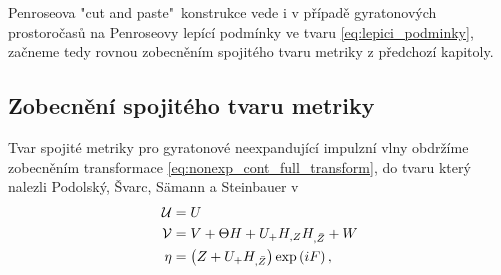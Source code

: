 Penroseova "cut and paste"\ konstrukce vede i v případě gyratonových prostoročasů na Penroseovy lepící podmínky ve tvaru \eqref{eq:lepici_podminky}, začneme tedy rovnou zobecněním
spojitého tvaru metriky z předchozí kapitoly.

\subsection{Zobecnění spojitého tvaru metriky}
Tvar spojité metriky pro gyratonové neexpandující impulzní vlny obdržíme zobecněním transformace \eqref{eq:nonexp_cont_full_transform},
do tvaru který nalezli Podolský, Švarc, Sämann a Steinbauer v \cite{Podolsky_2017}
\begin{equation}
    \label{eq:gyraton_cont_transformation}
    \begin{split}
        \mathcal{U} &= U \\
        \mathcal{V} &= V + \Theta H + U_{+} H_{,Z} H_{,\bar{Z}} + W \\
        \eta &= \left(Z + U_{+} H_{,\bar{Z}}\right) \exp \left(i F \right),
    \end{split}
\end{equation}

